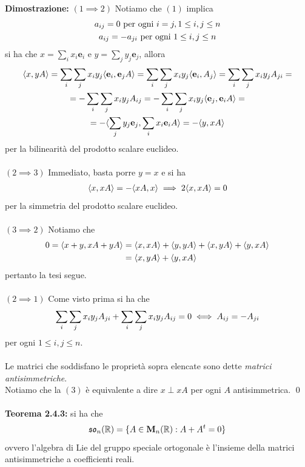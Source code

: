 \documentclass{article}
\begin{document}
\textbf{Dimostrazione:} $(1 \implies 2)$ Notiamo che $(1)$ implica
\begin{gather}
    a_{ij} = 0 \text{ per ogni } i = j, 1 \leq i, j \leq n \notag \\
    a_{ij} = - a_{ji} \text{ per ogni } 1 \leq i, j \leq n \notag
\end{gather}
si ha che $x = \sum_i x_i \mathbf{e}_i$ e $y = \sum_j y_j \mathbf{e}_j$, allora
\begin{gather}
    \langle x, yA \rangle = \sum_i \sum_j x_iy_j \langle \mathbf{e}_i, \mathbf{e}_jA \rangle = \sum_i \sum_j x_iy_j \langle \mathbf{e}_i, A_j \rangle \notag = \sum_i \sum_j x_iy_jA_{ji} = \notag \\
    = - \sum_i \sum_j x_iy_j A_{ij} = -\sum_i \sum_j x_iy_j \langle \mathbf{e}_j, \mathbf{e}_iA \rangle = \notag \\
    = -\langle \sum_j y_j\mathbf{e}_j, \sum_i x_i\mathbf{e}_i A \rangle = -\langle y, xA \rangle \notag
\end{gather}
per la bilinearità del prodotto scalare euclideo. \\ \\
$(2 \implies 3)$ Immediato, basta porre $y = x$ e si ha
\begin{gather}
    \langle x, xA \rangle = - \langle xA, x \rangle \implies 2\langle x, xA \rangle = 0 \notag
\end{gather}
per la simmetria del prodotto scalare euclideo. \\ \\
$(3 \implies 2)$ Notiamo che
\begin{align}
    0 = \langle x + y, xA + yA \rangle &= \langle x, xA \rangle + \langle y, yA \rangle + \langle x, yA \rangle + \langle y, xA \rangle \notag \\
    &= \langle x, yA \rangle + \langle y, xA \rangle \notag
\end{align}
pertanto la tesi segue. \\ \\
$(2 \implies 1)$ Come visto prima si ha che
\begin{gather}
    \sum_i \sum_j x_iy_j A_{ji} + \sum_i \sum_j x_iy_j A_{ij} = 0 \iff A_{ij} = -A_{ji} \notag
\end{gather}
per ogni $1 \leq i, j \leq n$. \\ \\
Le matrici che soddisfano le proprietà sopra elencate sono dette \textit{matrici antisimmetriche}. \\
Notiamo che la $(3)$ è equivalente a dire $x \perp xA$ per ogni $A$ antisimmetrica. \qed \\ \\
\textbf{Teorema 2.4.3:} si ha che
\begin{gather}
    \mathfrak{so}_n(\mathbb{R}) = \{ A \in \mathbf{M}_n(\mathbb{R}) : A + A^t = 0 \} \notag
\end{gather}
ovvero l'algebra di Lie del gruppo speciale ortogonale è l'insieme della matrici antisimmetriche a coefficienti reali. \\
\end{document}

